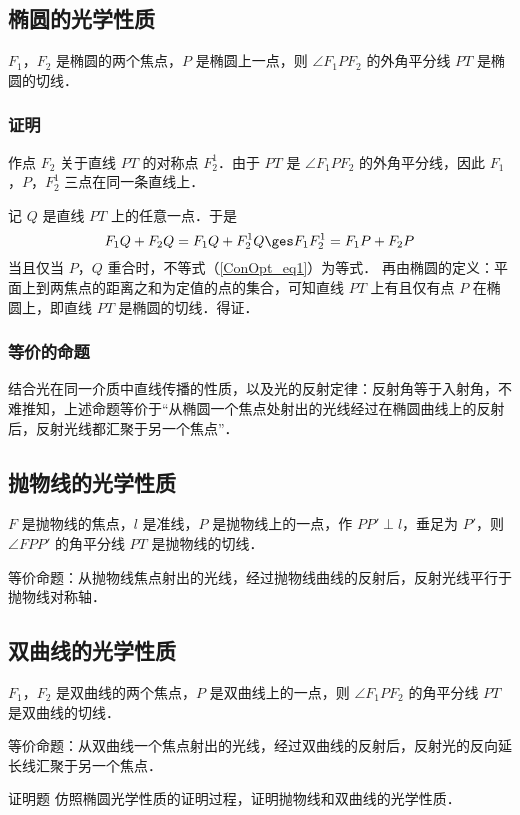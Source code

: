 

\subsection{椭圆的光学性质}
$F_1$，$F_2$ 是椭圆的两个焦点，$ P $ 是椭圆上一点，则 $\angle F_1PF_2 $ 的外角平分线 $ PT $ 是椭圆的切线．

\subsubsection{证明}
作点 $F_2$ 关于直线 $PT$ 的对称点 $F_2^1$．由于 $PT$ 是 $\angle F_1PF_2 $ 的外角平分线，因此 $F_1$，$P$，$F_2^1$ 三点在同一条直线上．

记 $Q$ 是直线 $PT$ 上的任意一点．于是
\begin{equation}\label{ConOpt_eq1}
F_1Q + F_2Q = F_1Q + F_2^1Q \ges F_1F_2^1 = F_1P + F_2P
\end{equation}
当且仅当 $P$，$Q$ 重合时，不等式（\autoref{ConOpt_eq1}）为等式．
再由椭圆的定义：平面上到两焦点的距离之和为定值的点的集合，可知直线 $PT$ 上有且仅有点 $P$ 在椭圆上，即直线 $PT$ 是椭圆的切线．得证．

\subsubsection{等价的命题}
结合光在同一介质中直线传播的性质，以及光的反射定律：反射角等于入射角，不难推知，上述命题等价于“从椭圆一个焦点处射出的光线经过在椭圆曲线上的反射后，反射光线都汇聚于另一个焦点”．

\subsection{抛物线的光学性质}
$F$ 是抛物线的焦点，$l$ 是准线，$P$ 是抛物线上的一点，作 $PP' \perp l$，垂足为 $P'$，则 $\angle FPP' $ 的角平分线 $ PT $ 是抛物线的切线．

等价命题：从抛物线焦点射出的光线，经过抛物线曲线的反射后，反射光线平行于抛物线对称轴．

\subsection{双曲线的光学性质}
$F_1$，$F_2$ 是双曲线的两个焦点，$P$ 是双曲线上的一点，则 $\angle F_1PF_2 $ 的角平分线 $ PT $ 是双曲线的切线．

等价命题：从双曲线一个焦点射出的光线，经过双曲线的反射后，反射光的反向延长线汇聚于另一个焦点．

\begin{exer}{证明题}\label{ConOpt_exe1}
仿照椭圆光学性质的证明过程，证明抛物线和双曲线的光学性质．
\end{exer}